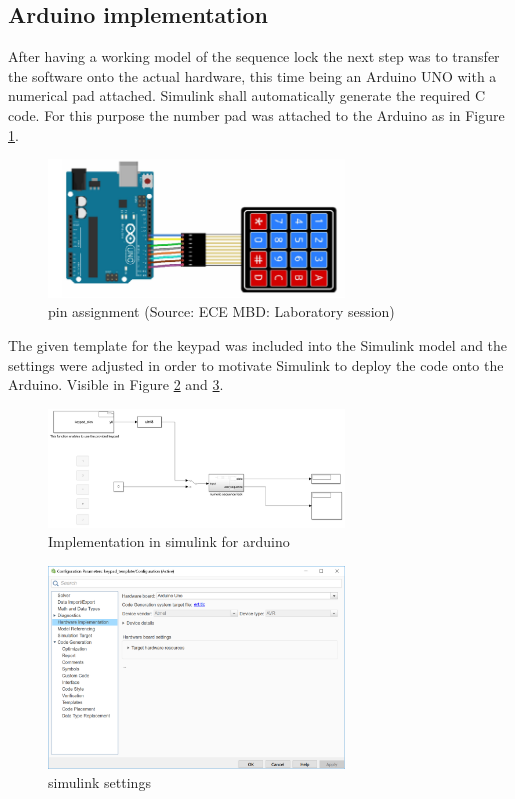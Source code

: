 		\subsection{Arduino implementation}
		After having a working model of the sequence lock the next step was to transfer the software onto the actual hardware, this time being an Arduino UNO with a numerical pad attached. Simulink shall automatically generate the required C code. For this purpose the number pad was attached to the Arduino as in Figure \ref{fig:ard_wir}.
			\begin{figure}[H]
					\centering
					\includegraphics[width=0.7\textwidth]{figures/arduino_wiring.png}
					\caption{pin assignment (Source: ECE MBD: Laboratory session)}
					\label{fig:ard_wir}
			\end{figure}
		The given template for the keypad was included into the Simulink model and the settings were adjusted in order to motivate Simulink to deploy the code onto the Arduino. Visible in Figure \ref{fig:ard_imp} and \ref{fig:settings}.
			\begin{figure}[H]
					\centering
					\includegraphics[width=0.7\textwidth]{figures/arduino_implementation.png}
					\caption{Implementation in simulink for arduino}
					\label{fig:ard_imp}
			\end{figure}
			\begin{figure}[H]
					\centering
					\includegraphics[width=0.7\textwidth]{figures/simulink_settings.png}
					\caption{simulink settings}
					\label{fig:settings}
			\end{figure}
